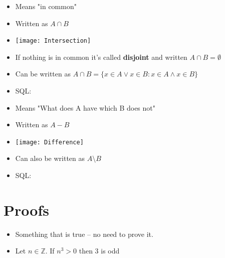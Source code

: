 \documentclass[english,10pt,a4paper]{article}
\begin{document}
\begin{theo}[Intersection] 
\begin{itemize}
\item Means "in common"
\item Written as $A \cap B$
\item[] \texttt{[image: Intersection]} 
\item If nothing is in common it's called \textbf{disjoint} and written $A \cap B = \emptyset$
\item Can be written as $A \cap B = \{ x \in A \vee x \in B : x \in A \wedge x \in B \}$
\item SQL: \\
\end{itemize}

\end{theo}



\begin{theo}[Difference] 
\begin{itemize}
\item Means "What does A have which B does not"
\item Written as $A - B$
\item[] \texttt{[image: Difference]} 
\item Can also be written as $A \setminus B $
\item SQL: \\
\end{itemize}

\end{theo}





\section{Proofs}


\begin{theo} 
\begin{itemize}
\item Something that is true -- no need to prove it.
\item Let $n \in \mathbb{Z}$. If $n^3 > 0$ then 3 is odd
\end{itemize}
\end{theo}
\end{document}
